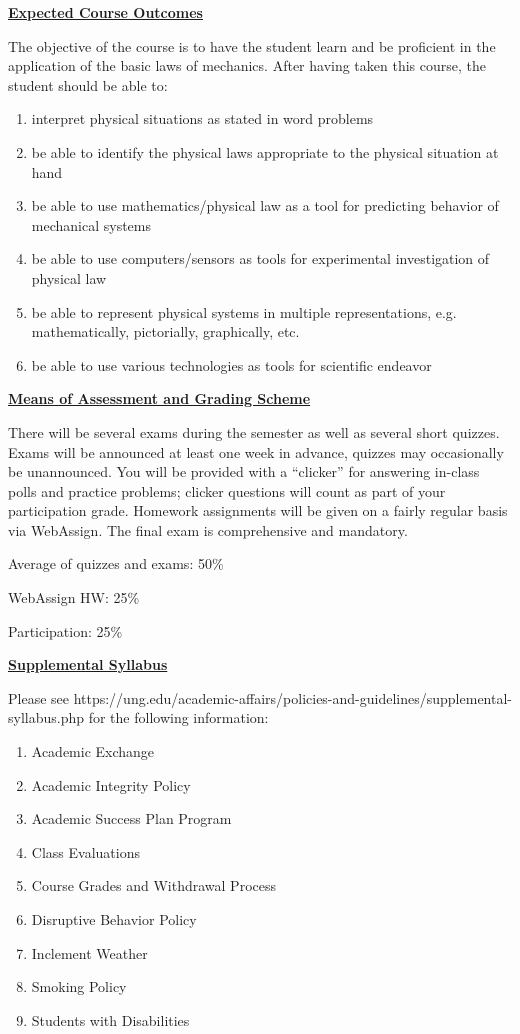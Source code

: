 \documentclass[12pt]{article}
\begin{document}
\underline{\textbf{Expected Course Outcomes}} \par
The objective of the course is to have the student learn and be proficient in the application of the basic laws of mechanics.
After having taken this course, the student should be able to:
\begin{enumerate}
\item interpret physical situations as stated in word problems
\item be able to identify the physical laws appropriate to the physical situation at hand
\item be able to use mathematics/physical law as a tool for predicting behavior of mechanical systems
\item be able to use computers/sensors as tools for experimental investigation of physical law
\item be able to represent physical systems in multiple representations, e.g. mathematically, pictorially, graphically, etc.
\item be able to use various technologies as tools for scientific endeavor
\end{enumerate}
\hfill \break

\underline{\textbf{Means of Assessment and Grading Scheme}} \par
There will be several exams during the semester as well as several short quizzes.
Exams will be announced at least one week in advance, quizzes may occasionally be unannounced.
You will be provided with a ``clicker'' for answering in-class polls and practice problems; clicker questions will count as part of your participation grade.
Homework assignments will be given on a fairly regular basis via WebAssign.
The final exam is comprehensive and mandatory. \par
\hfill \break
Average of quizzes and exams: 50\% \par
WebAssign HW: 25\% \par
Participation: 25\%
\hfill \break

\underline{\textbf{Supplemental Syllabus}} \par
Please see https://ung.edu/academic-affairs/policies-and-guidelines/supplemental-syllabus.php for the following information:
\begin{enumerate}
\item Academic Exchange
\item Academic Integrity Policy
\item Academic Success Plan Program
\item Class Evaluations
\item Course Grades and Withdrawal Process
\item Disruptive Behavior Policy
\item Inclement Weather
\item Smoking Policy
\item Students with Disabilities
\end{enumerate}
\end{document}
